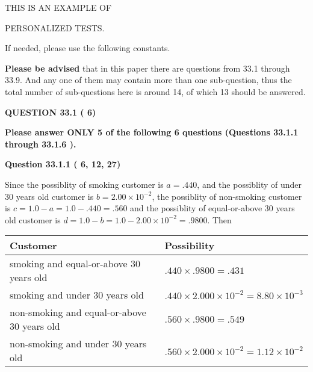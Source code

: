 \documentclass[12pt]{article}
\begin{document}
   
   
   
 \vspace{0.2in}
 
 
{\Huge  THIS IS AN EXAMPLE OF}
 
{\Huge  PERSONALIZED TESTS. }
 
If needed, please use the following constants.
 
 
 
{\textbf{\large{Please be advised}}} that in this paper there are questions from
33.1 through
33.9.
And any one of them may contain more than one sub-question, thus the total number
of sub-questions here is around 14, of which
13 should be answered.
 
\vspace{0.3in}
 
 
   
   
  
\vspace{0.2in}
  
{\textbf{\Large{QUESTION
33.1 
 (          6)
}}}
  
  
{\textbf{\Large{Please answer ONLY  %
           5 %
 of the following  %
           6 %
 questions (Questions  %
33.1.1 %
 through  %
33.1.6 %
 ). }}}
   
   
  
\vspace{0.2in}
  
{\textbf{\Large{Question
33.1.1 
 (          6,         12,         27)
}}}
  
  
 
 

Since the possiblity of  %
smoking customer is $ a =  %
.440 $,
and the possiblity of  %
 under 30 years old customer is $ b =  %
2.00 \times 10^{-2} $,
the possiblity of  %
non-smoking customer is $ c = 1.0 - a = 1.0 -
.440
=  %
.560 $ and the possiblity of  %
equal-or-above 30 years old
customer is $ d = 1.0 - b = 1.0 -  %
2.00 \times 10^{-2} =  %
.9800  $.
Then
 
\noindent
\begin{tabular}{|l|l|}
\hline
Customer & Possibility \\
\hline
smoking  and  %
equal-or-above 30 years old  &
  $ %
.440 \times  %
.9800 =  %
.431$ \\
\hline
smoking  and  %
under 30 years old &
  $ %
.440 \times  %
2.000 \times 10^{-2} =  %
8.80 \times 10^{-3}$ \\
\hline
 non-smoking and  %
equal-or-above 30 years old  &
  $ %
.560 \times  %
.9800 =  %
.549$ \\
\hline
 non-smoking and  %
under 30 years old &
  $ %
.560 \times  %
2.000 \times 10^{-2} =  %
1.12 \times 10^{-2}$ \\
\hline
\end{tabular}
 
\end{document}
